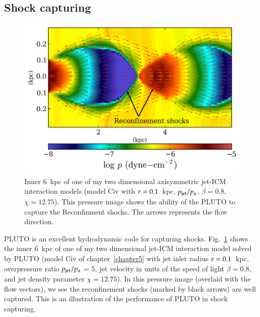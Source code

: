 \subsection{Shock capturing}
\begin{figure}[h!]
\includegraphics{rsk.png}
\caption{Inner 6~kpc of one of my two dimensional axisymmetric jet-ICM interaction models (model Civ with $r_{\rm}=0.1$~kpc, $p_{\rm jet}/p_{\rm a}$, $\beta=0.8$, $\chi = 12.75$). This pressure image shows the ability of the PLUTO to capture the Reconfinment shocks. The arrows represents the flow direction. }
\label{f:rsk}
\end{figure}

PLUTO is an excellent hydrodynamic code for capturing shocks. Fig.~\ref{f:rsk} shows the inner 6~kpc of one of my two dimensional jet-ICM interaction model solved by PLUTO (model Civ of chapter~\ref{chapter5} with jet inlet radius $r_{\rm}=0.1$~kpc, overpressure ratio $p_{\rm jet}/p_{\rm a}$ = 5, jet velocity in units of the speed of light $\beta=0.8$, and jet density parameter $\chi = 12.75$). In this pressure image (overlaid with the flow vectors), we see the reconfinement shocks (marked by black arrows) are well captured. This is an illustration of the performance of PLUTO in shock capturing.  

